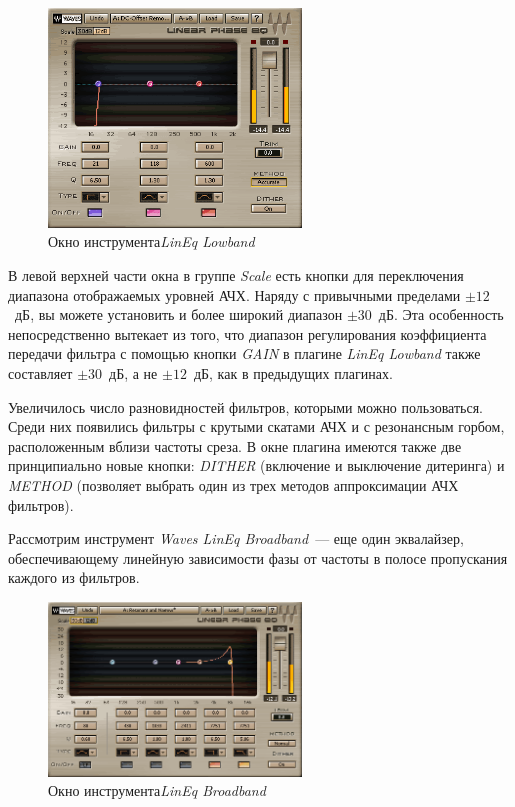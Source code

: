 \documentclass[oneside, final, 14pt]{extreport}
\begin{document}
\begin{figure}[h!]
  \centering
  \includegraphics[width=0.6\textwidth]{pic-waves-03}
  \caption{Окно инструмента\emph{LinEq Lowband}}
  \label{pic-waves-03}
\end{figure}

В левой верхней части окна в группе \emph{Scale} есть кнопки для переключения диапазона отображаемых уровней АЧХ. Наряду с привычными пределами $\pm12$~дБ, вы можете установить и более широкий диапазон $\pm30$~дБ. Эта особенность непосредственно вытекает из того, что диапазон регулирования коэффициента передачи фильтра с помощью кнопки \emph{GAIN} в плагине \emph{LinEq Lowband} также составляет $\pm30$~дБ, а не $\pm12$~дБ, как в предыдущих плагинах.

Увеличилось число разновидностей фильтров, которыми можно пользоваться. Среди них появились фильтры с крутыми скатами АЧХ и с резонансным горбом, расположенным вблизи частоты среза. В окне плагина имеются также две принципиально новые кнопки: \emph{DITHER} (включение и выключение дитеринга) и \emph{METHOD} (позволяет выбрать один из трех методов аппроксимации АЧХ фильтров).

Рассмотрим инструмент \emph{Waves LinEq Broadband}~--- еще один эквалайзер, обеспечивающему линейную зависимости фазы от частоты в полосе пропускания каждого из фильтров.

\begin{figure}[h!]
  \centering
  \includegraphics[width=0.6\textwidth]{pic-waves-04}
  \caption{Окно инструмента\emph{LinEq Broadband}}
  \label{pic-waves-04}
\end{figure}
\end{document}
